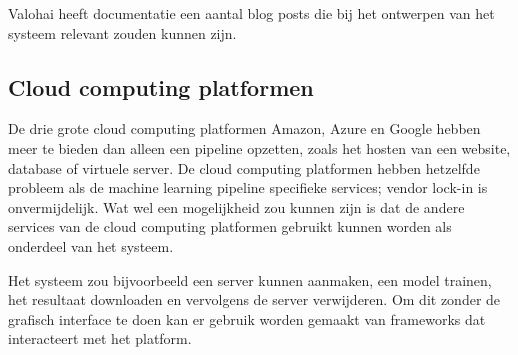 Valohai heeft documentatie een aantal blog posts die bij het ontwerpen van het systeem relevant zouden kunnen zijn. 

\subsection{Cloud computing platformen}\label{subsec:cloud-computing-platformen}
De drie grote cloud computing platformen Amazon, Azure en Google hebben meer te bieden dan alleen een pipeline opzetten, zoals het hosten van een website, database of virtuele server. De cloud computing platformen hebben hetzelfde probleem als de machine learning pipeline specifieke services; vendor lock-in is onvermijdelijk. Wat wel een mogelijkheid zou kunnen zijn is dat de andere services van de cloud computing platformen gebruikt kunnen worden als onderdeel van het systeem.

Het systeem zou bijvoorbeeld een server kunnen aanmaken, een model trainen, het resultaat downloaden en vervolgens de server verwijderen. Om dit zonder de grafisch interface te doen kan er gebruik worden gemaakt van frameworks dat interacteert met het platform.



